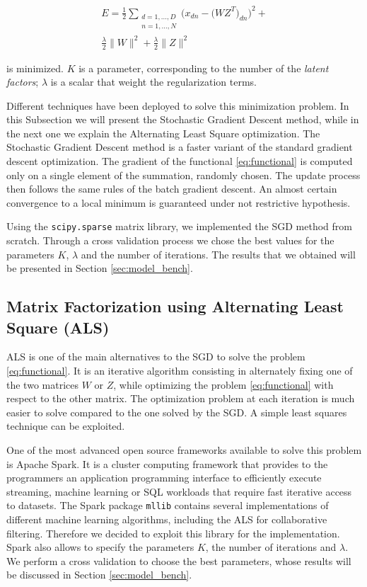 \documentclass[10pt,conference,compsocconf]{IEEEtran}
\begin{document}
\begin{multline}
\label{eq:functional}
E = \frac{1}{2} \sum_{\substack{d=1,...,D \\n=1,...,N}} 
\bigg( x_{dn} - \big( WZ^T \big)_{dn} \bigg) ^2 + \\ 
\frac{\lambda}{2}\|W\|^2 + \frac{\lambda}{2}\|Z\|^2
\end{multline} 

is minimized. $K$ is a parameter,
corresponding to the number of the \textit{latent factors}; $\lambda$ is a scalar 
that weight the regularization terms.

Different techniques have been deployed to solve this minimization problem. In this Subsection we
will present the Stochastic Gradient Descent method, while in the next one we explain the
Alternating Least Square optimization. 
The Stochastic Gradient Descent method is a faster variant of the standard gradient descent
optimization. The gradient of the functional \ref{eq:functional} is computed only on a single
element of the summation, randomly chosen. The update process then follows the same rules of the batch
gradient descent.
An almost certain convergence to a local minimum is guaranteed under not restrictive hypothesis.

Using the \texttt{scipy.sparse} matrix library, we implemented the SGD method from scratch.
Through a cross validation process we chose the best values for the parameters $K$, $\lambda$ and
the number of iterations. The results that we obtained will be presented in Section
\ref{sec:model_bench}.

\subsection{Matrix Factorization using Alternating Least Square (ALS)}
ALS is one of the main alternatives to the SGD to solve the problem \ref{eq:functional}.
It is an iterative algorithm consisting in alternately fixing one of the two matrices $W$ or $Z$,
while optimizing the problem \ref{eq:functional} with respect to the other matrix.
The optimization problem at each iteration is much easier to solve compared to the one solved by the
SGD. A simple least squares technique can be exploited.

One of the most advanced open source frameworks available to solve this problem is Apache Spark. It
is a cluster computing framework that provides to the programmers an application programming
interface to efficiently execute streaming, machine learning or SQL workloads that require fast
iterative access to datasets.
The Spark package \texttt{mllib} contains several implementations of different machine learning
algorithms, including the ALS for collaborative filtering. Therefore we decided to exploit this
library for the implementation.
Spark also allows to specify the parameters $K$, the number of iterations and $\lambda$. We perform a
cross validation to choose the best parameters, whose results will be discussed in Section 
\ref{sec:model_bench}.
\end{document}
